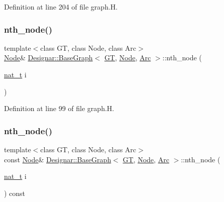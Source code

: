 Definition at line 204 of file graph.\+H.

\mbox{\label{class_designar_1_1_base_graph_ae71b167fa33e8233cac2807d7c9e8930}} 
\subsubsection{\texorpdfstring{nth\+\_\+node()}{nth\_node()}\hspace{0.1cm}{\footnotesize\ttfamily [1/2]}}
{\footnotesize\ttfamily template$<$class GT, class Node, class Arc$>$ \\
\hyperlink{namespace_designar_a5af326c65aa2bd26b26c410f2030d09e}{Node}\& \hyperlink{class_designar_1_1_base_graph}{Designar\+::\+Base\+Graph}$<$ \hyperlink{demo-buildgraph_8_c_a3001c40d2c31ca87ed96cd7d1334a55e}{GT}, \hyperlink{namespace_designar_a5af326c65aa2bd26b26c410f2030d09e}{Node}, \hyperlink{namespace_designar_a3f55fb5513d62ff47cbc8f72b8e95d6f}{Arc} $>$\+::nth\+\_\+node (\begin{DoxyParamCaption}\item[{\hyperlink{namespace_designar_aa72662848b9f4815e7bf31a7cf3e33d1}{nat\+\_\+t}}]{i }\end{DoxyParamCaption})\hspace{0.3cm}{\ttfamily [inline]}}



Definition at line 99 of file graph.\+H.

\mbox{\label{class_designar_1_1_base_graph_aef085a54ee983b91ace1cbbe902bc28b}} 
\subsubsection{\texorpdfstring{nth\+\_\+node()}{nth\_node()}\hspace{0.1cm}{\footnotesize\ttfamily [2/2]}}
{\footnotesize\ttfamily template$<$class GT, class Node, class Arc$>$ \\
const \hyperlink{namespace_designar_a5af326c65aa2bd26b26c410f2030d09e}{Node}\& \hyperlink{class_designar_1_1_base_graph}{Designar\+::\+Base\+Graph}$<$ \hyperlink{demo-buildgraph_8_c_a3001c40d2c31ca87ed96cd7d1334a55e}{GT}, \hyperlink{namespace_designar_a5af326c65aa2bd26b26c410f2030d09e}{Node}, \hyperlink{namespace_designar_a3f55fb5513d62ff47cbc8f72b8e95d6f}{Arc} $>$\+::nth\+\_\+node (\begin{DoxyParamCaption}\item[{\hyperlink{namespace_designar_aa72662848b9f4815e7bf31a7cf3e33d1}{nat\+\_\+t}}]{i }\end{DoxyParamCaption}) const\hspace{0.3cm}{\ttfamily [inline]}}




